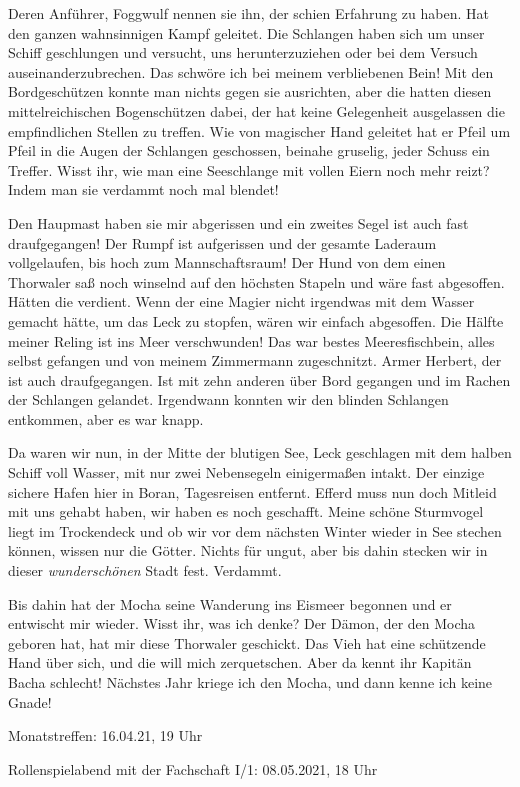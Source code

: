 \documentclass[final]{multiversum}
\begin{document}
Deren Anführer, Foggwulf nennen sie ihn, der schien Erfahrung zu haben. 
Hat den ganzen wahnsinnigen Kampf geleitet.
Die Schlangen haben sich um unser Schiff geschlungen und versucht, uns herunterzuziehen oder bei dem Versuch auseinanderzubrechen.
Das schwöre ich bei meinem verbliebenen Bein!
Mit den Bordgeschützen konnte man nichts gegen sie ausrichten, aber die hatten diesen mittelreichischen Bogenschützen dabei, der hat keine Gelegenheit ausgelassen die empfindlichen Stellen zu treffen.
Wie von magischer Hand geleitet hat er Pfeil um Pfeil in die Augen der Schlangen geschossen, beinahe gruselig, jeder Schuss ein Treffer.
Wisst ihr, wie man eine Seeschlange mit vollen Eiern noch mehr reizt?
Indem man sie verdammt noch mal blendet!

Den Haupmast haben sie mir abgerissen und ein zweites Segel ist auch fast draufgegangen!
Der Rumpf ist aufgerissen und der gesamte Laderaum vollgelaufen, bis hoch zum Mannschaftsraum!
Der Hund von dem einen Thorwaler saß noch winselnd auf den höchsten Stapeln und wäre fast abgesoffen.
Hätten die verdient.
Wenn der eine Magier nicht irgendwas mit dem Wasser gemacht hätte, um das Leck zu stopfen, wären wir einfach abgesoffen.
Die Hälfte meiner Reling ist ins Meer verschwunden!
Das war bestes Meeresfischbein, alles selbst gefangen und von meinem Zimmermann zugeschnitzt.
Armer Herbert, der ist auch draufgegangen. 
Ist mit zehn anderen über Bord gegangen und im Rachen der Schlangen gelandet.
Irgendwann konnten wir den blinden Schlangen entkommen, aber es war knapp.

Da waren wir nun, in der Mitte der blutigen See, Leck geschlagen mit dem halben Schiff voll Wasser, mit nur zwei Nebensegeln einigermaßen intakt.
Der einzige sichere Hafen hier in Boran, Tagesreisen entfernt.
Efferd muss nun doch Mitleid mit uns gehabt haben, wir haben es noch geschafft.
Meine schöne Sturmvogel liegt im Trockendeck und ob wir vor dem nächsten Winter wieder in See stechen können, wissen nur die Götter.
Nichts für ungut, aber bis dahin stecken wir in dieser \textit{wunderschönen} Stadt fest.
Verdammt.

Bis dahin hat der Mocha seine Wanderung ins Eismeer begonnen und er entwischt mir wieder.
Wisst ihr, was ich denke?
Der Dämon, der den Mocha geboren hat, hat mir diese Thorwaler geschickt.
Das Vieh hat eine schützende Hand über sich, und die will mich zerquetschen.
Aber da kennt ihr Kapitän Bacha schlecht!
Nächstes Jahr kriege ich den Mocha, und dann kenne ich keine Gnade!


\begin{termine}
\item Monatstreffen: 16.04.21, 19 Uhr
\item Rollenspielabend mit der Fachschaft I/1: 08.05.2021, 18 Uhr
\end{termine}
\impressum
\end{document}

